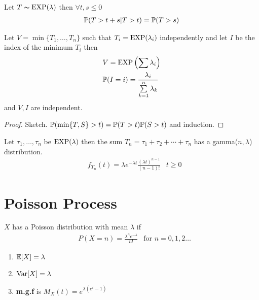 \documentclass[12pt,a4paper]{article}
\begin{document}
\begin{thm}
    Let $T\sim \EXP(\lambda)$ then $\forall t,s\leq 0$
    \begin{align*}
        \P(T > t+s | T > t) = \P(T > s)
    \end{align*}
\end{thm}
\begin{thm}
    Let $V = \min\{T_1, \ldots, T_n\}$ such that $T_i = \EXP(\lambda_i)$ independently and let $I$ be the index of the minimum $T_i$ then 
    \begin{align*}
        &V = \EXP\left(\sum \lambda_i\right)\\
        &\P(I = i) = \frac{\lambda_i}{\nsum{k=1}n \lambda_k}
    \end{align*}
    and $V,I$ are independent. 
\end{thm}
\begin{proof}
    Sketch. $\P(\min\{T,S\} > t) = \P(T>t)\P(S>t)$ and induction.
\end{proof}

\begin{thm}
    Let $\tau_1, \ldots, \tau_n$ be $\EXP(\lambda)$ then the sum $T_n = \tau_1 + \tau_2 + \cdots + \tau_n$ has a gamma($n, \lambda$) distribution. 
    \begin{align*}
        &f_{T_n}(t) = \lambda e^{-\lambda t} \frac{(\lambda t)^{n-1}}{(n-1)!} & t \geq 0
    \end{align*}
\end{thm}
\newpage
\section{Poisson Process}
\begin{defn}
    $X$ has a Poisson distribution with mean $\lambda$ if 
    \begin{align*}
        &P(X = n) = \frac{\lambda^n e^{-\lambda}}{n!} & \text{for $n = 0,1,2\ldots$}
    \end{align*} 
    \begin{enumerate}[(1)]
        \item $\E[X] = \lambda$
        \item $\Var[X] = \lambda$
        \item \textbf{m.g.f} is $M_X(t) = e^{\lambda(e^t - 1)}$
    \end{enumerate}
\end{defn}
\end{document}
